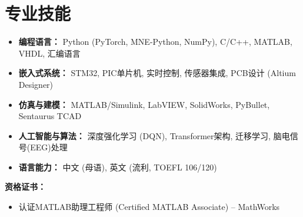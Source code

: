 \documentclass[11pt, a4paper]{article}
\begin{document}
\section{专业技能}
\begin{itemize}[leftmargin=*, nosep, topsep=2pt]
    \item \textbf{编程语言：} Python (PyTorch, MNE-Python, NumPy), C/C++, MATLAB, VHDL, 汇编语言
    \item \textbf{嵌入式系统：} STM32, PIC单片机, 实时控制, 传感器集成, PCB设计 (Altium Designer)
    \item \textbf{仿真与建模：} MATLAB/Simulink, LabVIEW, SolidWorks, PyBullet, Sentaurus TCAD
    \item \textbf{人工智能与算法：} 深度强化学习 (DQN), Transformer架构, 迁移学习, 脑电信号(EEG)处理
    \item \textbf{语言能力：} 中文 (母语), 英文 (流利, TOEFL 106/120)
\end{itemize}

\vspace{4pt}
\textbf{资格证书：}
\begin{itemize}[leftmargin=*, nosep, topsep=2pt]
    \item 认证MATLAB助理工程师 (Certified MATLAB Associate) -- MathWorks
\end{itemize}
\end{document}

